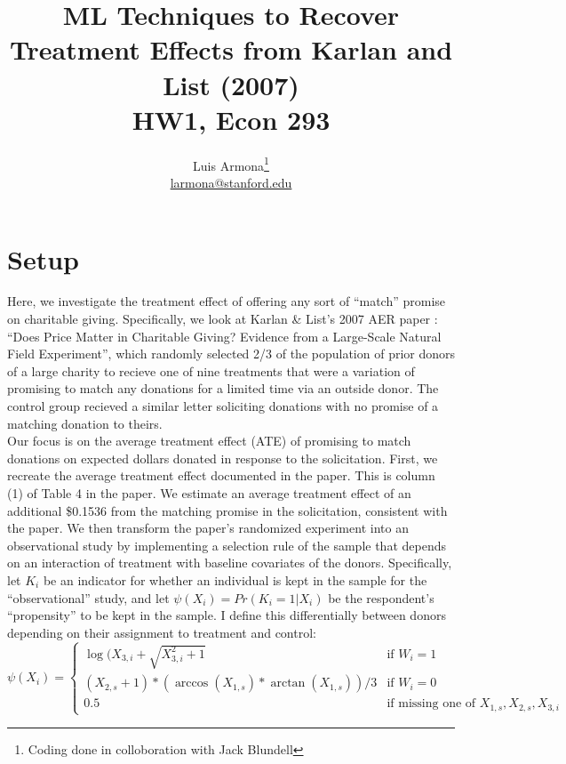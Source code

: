 \documentclass{article}
\begin{document}
\title{ML Techniques to Recover Treatment Effects from Karlan and List (2007) \\ HW1, Econ 293}
\author{Luis Armona\footnote{Coding done in colloboration with Jack Blundell} \\ \href{mailto:larmona@stanford.edu}{larmona@stanford.edu} }
\maketitle

\section{Setup}
Here, we investigate the treatment effect of offering any sort of ``match'' promise on charitable giving. Specifically, we look at Karlan \& List's 2007 AER paper : ``Does Price Matter in Charitable Giving? Evidence from a Large-Scale Natural Field Experiment'', which randomly selected 2/3 of the population of prior donors of a large charity to recieve one of nine treatments that were a variation of promising to match any donations for a limited time via an outside donor. The control group recieved a similar letter soliciting donations with no promise of a matching donation to theirs. \\ \indent
Our focus is on the average treatment effect (ATE) of promising to match donations on expected dollars donated in response to the solicitation. First, we recreate the average treatment effect documented in the paper. This is column (1) of Table 4 in the paper. We estimate an average treatment effect of an additional
\$0.1536 from the matching promise in the solicitation, consistent with the paper. We then transform the paper's randomized experiment into an observational study by implementing a selection rule of the sample that depends on an interaction of treatment with baseline covariates of the donors. Specifically, let $K_i$ be an indicator for whether an individual is kept in the sample for the ``observational'' study, and let $\psi(X_i) = Pr(K_i=1|X_i)$ be the respondent's ``propensity'' to be kept in the sample. I define this differentially between donors depending on their assignment to treatment and control:
\[
  \psi(X_i)= \begin{cases}
  	  \log(X_{3,i} + \sqrt{X_{3,i} ^ 2 + 1} & \text{if $W_i=1$} \\
	  (X_{2,s}+1)*(\arccos(X_{1,s})*\arctan(X_{1,s}) )/3 & \text{if $W_i=0$} \\ 
     0.5 & \text{if missing one of $X_{1,s},X_{2,s},X_{3,i}$}
      \end{cases} 
\]
\end{document}
